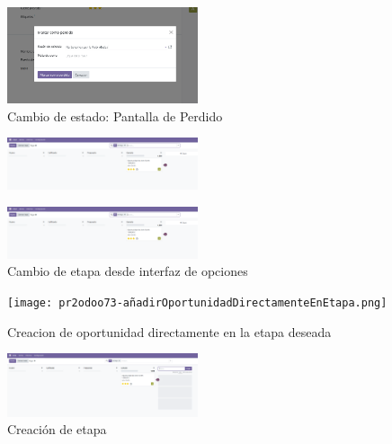 \documentclass[a4paper,12pt]{article}
\begin{document}
\begin{figure}[h!]
    \centering
    \includegraphics[width=0.5\textwidth]{pr2odoo71-oportunidadPerdida.png}
    \caption{Cambio de estado: Pantalla de Perdido}
\end{figure}
\FloatBarrier

\begin{figure}[h!]
    \centering
    \includegraphics[width=0.5\textwidth]{pr2odoo72-cambioDeEtapa.png}
    \caption{}
\end{figure}
\FloatBarrier

\begin{figure}[h!]
    \centering
    \includegraphics[width=0.5\textwidth]{pr2odoo72-cambioDeEtapa.png}
    \caption{Cambio de etapa desde interfaz de opciones}
\end{figure}
\FloatBarrier

\begin{figure}[h!]
    \centering
    \texttt{[image: pr2odoo73-añadirOportunidadDirectamenteEnEtapa.png]}
    \caption{Creacion de oportunidad directamente en la etapa deseada}
\end{figure}
\FloatBarrier

\begin{figure}[h!]
    \centering
    \includegraphics[width=0.5\textwidth]{pr2odoo74-crearEtapa.png}
    \caption{Creación de etapa}
\end{figure}
\FloatBarrier
\end{document}
